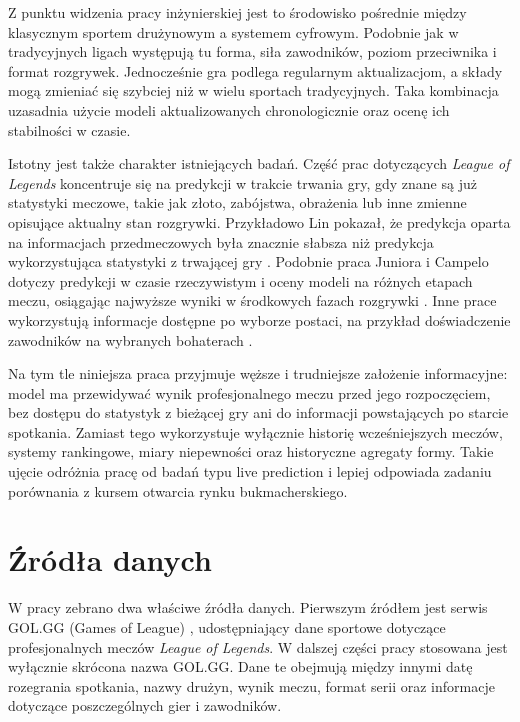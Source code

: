 Z punktu widzenia pracy inżynierskiej jest to środowisko pośrednie między klasycznym sportem drużynowym a systemem cyfrowym. Podobnie jak w tradycyjnych ligach występują tu forma, siła zawodników, poziom przeciwnika i format rozgrywek. Jednocześnie gra podlega regularnym aktualizacjom, a składy mogą zmieniać się szybciej niż w wielu sportach tradycyjnych. Taka kombinacja uzasadnia użycie modeli aktualizowanych chronologicznie oraz ocenę ich stabilności w czasie.

Istotny jest także charakter istniejących badań. Część prac dotyczących \textit{League of Legends} koncentruje się na predykcji w trakcie trwania gry, gdy znane są już statystyki meczowe, takie jak złoto, zabójstwa, obrażenia lub inne zmienne opisujące aktualny stan rozgrywki. Przykładowo Lin pokazał, że predykcja oparta na informacjach przedmeczowych była znacznie słabsza niż predykcja wykorzystująca statystyki z trwającej gry \parencite{lin2016lol}. Podobnie praca Juniora i Campelo dotyczy predykcji w czasie rzeczywistym i oceny modeli na różnych etapach meczu, osiągając najwyższe wyniki w środkowych fazach rozgrywki \parencite{junior2023lol}. Inne prace wykorzystują informacje dostępne po wyborze postaci, na przykład doświadczenie zawodników na wybranych bohaterach \parencite{do2021championExperience}.

Na tym tle niniejsza praca przyjmuje węższe i trudniejsze założenie informacyjne: model ma przewidywać wynik profesjonalnego meczu przed jego rozpoczęciem, bez dostępu do statystyk z bieżącej gry ani do informacji powstających po starcie spotkania. Zamiast tego wykorzystuje wyłącznie historię wcześniejszych meczów, systemy rankingowe, miary niepewności oraz historyczne agregaty formy. Takie ujęcie odróżnia pracę od badań typu live prediction i lepiej odpowiada zadaniu porównania z kursem otwarcia rynku bukmacherskiego.

\section{Źródła danych}

W pracy zebrano dwa właściwe źródła danych. Pierwszym źródłem jest serwis GOL.GG (Games of League) \parencite{golgg}, udostępniający dane sportowe dotyczące profesjonalnych meczów \textit{League of Legends}. W dalszej części pracy stosowana jest wyłącznie skrócona nazwa GOL.GG.
Dane te obejmują między innymi datę rozegrania spotkania, nazwy drużyn, wynik meczu, format serii oraz informacje dotyczące poszczególnych gier i zawodników.

